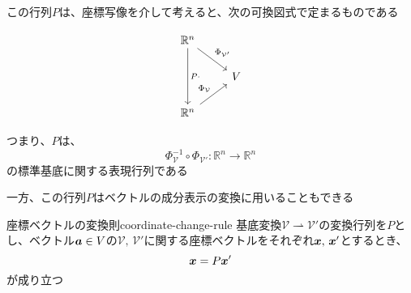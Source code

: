 \documentclass[../../../topic_linear-algebra]{subfiles}
\begin{document}
この行列$P$は、座標写像を介して考えると、次の可換図式で定まるものである

\begin{equation*}
  \begin{tikzcd}
    \mathbb{R}^n \arrow[dd, "P\cdot"] \arrow[rd,"{\Phi_{\mathcal{V}'}}"] & \\
    & V \\
    \mathbb{R}^n \arrow[ru,"{\Phi_{\mathcal{V}}}"]
  \end{tikzcd}
\end{equation*}

つまり、$P$は、
\begin{equation*}
  \Phi_{\mathcal{V}}^{-1} \circ \Phi_{\mathcal{V}'} \colon \mathbb{R}^n \to \mathbb{R}^n
\end{equation*}
の標準基底に関する表現行列である

\sectionline

一方、この行列$P$はベクトルの成分表示の変換に用いることもできる

\begin{theorem}{座標ベクトルの変換則}{coordinate-change-rule}
  基底変換$\mathcal{V} \rightharpoonup \mathcal{V}'$の変換行列を$P$とし、ベクトル$\vb*{a} \in V$の$\mathcal{V},\, \mathcal{V}'$に関する座標ベクトルをそれぞれ$\vb*{x},\, \vb*{x}'$とするとき、
  \begin{equation*}
    \vb*{x} = P \vb*{x}'
  \end{equation*}
  が成り立つ
\end{theorem}
\end{document}
